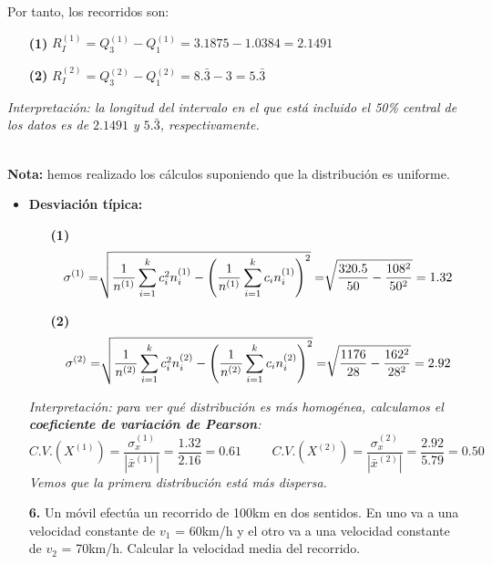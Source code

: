 \documentclass[11pt,a4paper]{article}
\theoremstyle{definition}
\begin{document}
\begin{itemize}
\begin{itemize}
		Por tanto, los recorridos son:
		\begin{itemize}
			\item[\textbf{(1)}] $R_I^{(1)} = Q_3^{(1)} - Q_1^{(1)} = 3.1875 - 1.0384 = 2.1491 $
			\item[\textbf{(2)}] $R_I^{(2)} = Q_3^{(2)} - Q_1^{(2)} = 8.\bar{3} -3 = 5.\bar{3}$
		\end{itemize}
		\emph{Interpretación: la longitud del intervalo en el que está incluido el 50\% central de los datos es de $2.1491$ y $5.\bar{3}$, respectivamente.}
\end{itemize}
\hspace{1cm} \\
\small {\textbf {Nota:} hemos realizado los cálculos suponiendo que la distribución es uniforme.} 
		\pagebreak
\begin{itemize}
		\item \textbf{Desviación típica:}
		\begin{itemize}
			\item[\textbf{(1)}] $$ \sigma^{(1)} = \sqrt[\leftroot{-2}\uproot{2}{}]{\frac{1}{n^{(1)}}  \sum_{i=1}^{k}c_i^2n_i^{(1)} - \left( \frac{1}{n^{(1)}}\sum_{i=1}^{k}c_{i}n_{i}^{(1)} \right)^2} = \sqrt[\leftroot{-2}\uproot{2}{}]{\frac{320.5}{50}-\frac{108^2}{50^2}} = 1.32 $$
			\item[\textbf{(2)}] $$ \sigma^{(2)} = \sqrt[\leftroot{-2}\uproot{2}{}]{\frac{1}{n^{(2)}}  \sum_{i=1}^{k}c_i^2n_i^{(2)} - \left( \frac{1}{n^{(2)}}\sum_{i=1}^{k}c_{i}n_{i}^{(2)} \right)^2} = \sqrt[\leftroot{-2}\uproot{2}{}]{\frac{1176}{28}-\frac{162^2}{28^2}} = 2.92 $$
		\end{itemize}
		\emph{Interpretación: para ver qué distribución es más homogénea, calculamos el \textbf{coeficiente de variación de Pearson}:}
		$$ C.V.(X^{(1)}) = \frac{\sigma_x^{(1)}}{|\bar{x}^{(1)}|} = \frac{1.32}{2.16} = 0.61 \hspace{1cm} C.V.(X^{(2)}) = \frac{\sigma_x^{(2)}}{|\bar{x}^{(2)}|} = \frac{2.92}{5.79} = 0.50 $$
		\emph{Vemos que la primera distribución está más dispersa.}
	\end{itemize}
\end{itemize}




\pagebreak

\begin{itemize}
	\item[\textbf{6.}] Un móvil efectúa un recorrido de 100km en dos sentidos. En uno va a una velocidad constante de $v_1$ = 60km/h y el otro va a una velocidad constante de $v_2$ = 70km/h. Calcular la velocidad media del recorrido.
\end{itemize}
\end{document}
